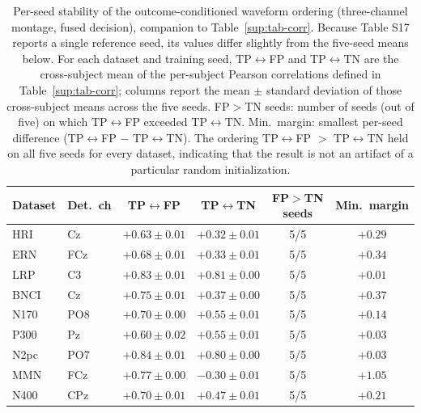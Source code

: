 \begin{table}[t]
\centering
\setlength{\tabcolsep}{6pt}
\caption{%
Per-seed stability of the outcome-conditioned waveform ordering (three-channel montage, fused decision), companion to Table~\ref{sup:tab-corr}. Because Table S17 reports a single reference seed, its values differ slightly from the five-seed means below. For each dataset and training seed, TP$\leftrightarrow$FP and TP$\leftrightarrow$TN are the cross-subject mean of the per-subject Pearson correlations defined in Table~\ref{sup:tab-corr}; columns report the mean $\pm$ standard deviation of those cross-subject means across the five seeds. FP${>}$TN seeds: number of seeds (out of five) on which TP$\leftrightarrow$FP exceeded TP$\leftrightarrow$TN. Min.\ margin: smallest per-seed difference (TP$\leftrightarrow$FP $-$ TP$\leftrightarrow$TN). The ordering TP$\leftrightarrow$FP $>$ TP$\leftrightarrow$TN held on all five seeds for every dataset, indicating that the result is not an artifact of a particular random initialization.%
}
\label{sup:tab-corr-perseed}
\begin{tabular}{llcccc}
\toprule
Dataset & Det.\ ch & TP$\leftrightarrow$FP & TP$\leftrightarrow$TN & FP$>$TN seeds & Min.\ margin \\
\midrule
HRI & Cz & $+0.63 \pm 0.01$ & $+0.32 \pm 0.01$ & 5/5 & $+0.29$ \\
ERN & FCz & $+0.68 \pm 0.01$ & $+0.33 \pm 0.01$ & 5/5 & $+0.34$ \\
LRP & C3 & $+0.83 \pm 0.01$ & $+0.81 \pm 0.00$ & 5/5 & $+0.01$ \\
BNCI & Cz & $+0.75 \pm 0.01$ & $+0.37 \pm 0.00$ & 5/5 & $+0.37$ \\
N170 & PO8 & $+0.70 \pm 0.00$ & $+0.55 \pm 0.01$ & 5/5 & $+0.14$ \\
P300 & Pz & $+0.60 \pm 0.02$ & $+0.55 \pm 0.01$ & 5/5 & $+0.03$ \\
N2pc & PO7 & $+0.84 \pm 0.01$ & $+0.80 \pm 0.00$ & 5/5 & $+0.03$ \\
MMN & FCz & $+0.77 \pm 0.00$ & $-0.30 \pm 0.01$ & 5/5 & $+1.05$ \\
N400 & CPz & $+0.70 \pm 0.01$ & $+0.47 \pm 0.01$ & 5/5 & $+0.21$ \\
\bottomrule
\end{tabular}
\end{table}

